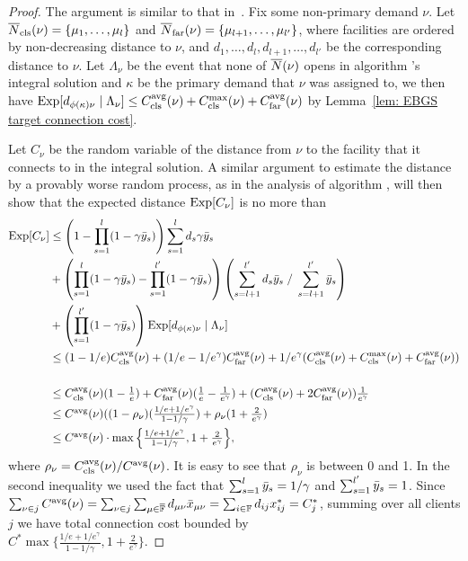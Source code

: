 \begin{proof}
  The argument is similar to that in~\cite{ByrkaGS10}. Fix some
  non-primary demand $\nu$. Let ${\overline{N}}_{{\mbox{\scriptsize\rm cls}}}(\nu) =
  \{\mu_1,\ldots,\mu_l\}$ and ${\overline{N}}_{{\mbox{\scriptsize\rm far}}}(\nu) = \{\mu_{l+1}, \ldots,
  \mu_{l'}\}$, where facilities are ordered by non-decreasing distance
  to $\nu$, and $d_1,\ldots,d_l,d_{l+1},\ldots,d_{l'}$ be the
  corresponding distance to $\nu$. Let $\Lambda_{\nu}$ be the event
  that none of ${\overline{N}}(\nu)$ opens in algorithm {\EBGS}'s integral
  solution and $\kappa$ be the primary demand that $\nu$ was assigned
  to, we then have $\mbox{\rm Exp}[d_{\phi(\kappa)\nu}\mid \Lambda_{\nu}] \leq
  C_{{\mbox{\scriptsize\rm cls}}}^{{\mbox{\scriptsize\rm avg}}}(\nu) + C_{{\mbox{\scriptsize\rm cls}}}^{\max}(\nu) + C_{{\mbox{\scriptsize\rm far}}}^{{\mbox{\scriptsize\rm avg}}}(\nu)$ by Lemma~\ref{lem:
    EBGS target connection cost}.

  Let $C_{\nu}$ be the random variable of the distance from $\nu$ to
  the facility that it connects to in the integral solution. A similar
  argument to estimate the distance by a provably worse random
  process, as in the analysis of algorithm {\ECHS}, will then show that
  the expected distance $\mbox{\rm Exp}[C_\nu]$ is no more than
  \begin{align*}
    \mbox{\rm Exp}[C_{\nu}] 
    &\leq \left(1-\prod_{s=1}^l (1-\gamma{\bar y}_s)\right) \sum_{s=1}^l d_s \gamma{\bar y}_s\\
    &+ \left(\prod_{s=1}^l(1-\gamma{\bar y}_s) - \prod_{s=1}^{l'}(1-\gamma{\bar y}_s)\right) \left(\sum_{s=l+1}^{l'} d_s{\bar y}_s\;/ \;\sum_{s=l+1}^{l'} {\bar y}_s \right)\\
    &+ \left(\prod_{s=1}^{l'} (1-\gamma{\bar y}_s)\right) \mbox{\rm Exp}[d_{\phi(\kappa)\nu} \mid \Lambda_\nu]\\
    &\leq (1-1/e)C_{{\mbox{\scriptsize\rm cls}}}^{{\mbox{\scriptsize\rm avg}}}(\nu) + (1/e - 1/e^\gamma)C_{{\mbox{\scriptsize\rm far}}}^{{\mbox{\scriptsize\rm avg}}}(\nu) + 1/e^\gamma (C_{{\mbox{\scriptsize\rm cls}}}^{{\mbox{\scriptsize\rm avg}}}(\nu) + C_{{\mbox{\scriptsize\rm cls}}}^{\max}(\nu) + C_{{\mbox{\scriptsize\rm far}}}^{{\mbox{\scriptsize\rm avg}}}(\nu))\\
\\
  &\leq 
	\textstyle
	C_{{\mbox{\scriptsize\rm cls}}}^{{\mbox{\scriptsize\rm avg}}}(\nu)(1-\frac{1}{e}) + C_{{\mbox{\scriptsize\rm far}}}^{{\mbox{\scriptsize\rm avg}}}(\nu)(\frac{1}{e}-\frac{1}{e^\gamma})
	 			+ (C_{{\mbox{\scriptsize\rm cls}}}^{{\mbox{\scriptsize\rm avg}}}(\nu)+2C_{{\mbox{\scriptsize\rm far}}}^{{\mbox{\scriptsize\rm avg}}}(\nu))\frac{1}{e^\gamma}
\\
  &\leq
	\textstyle
  C^{{\mbox{\scriptsize\rm avg}}}(\nu)((1-\rho_{\nu})(\frac{1/e+1/e^\gamma}{1-1/\gamma})
  + \rho_{\nu}(1+\frac{2}{e^\gamma}) 
\\
  &\leq 
	\textstyle
	C^{{\mbox{\scriptsize\rm avg}}}(\nu) \cdot \max\Big\{\frac{1/e+1/e^\gamma}{1-1/\gamma},
  								1+\frac{2}{e^\gamma}\Big\},
\end{align*}
%
where $\rho_{\nu}=C_{{\mbox{\scriptsize\rm cls}}}^{{\mbox{\scriptsize\rm avg}}}(\nu)/C^{{\mbox{\scriptsize\rm avg}}}(\nu)$. It is easy to see that
$\rho_{\nu}$ is between 0 and 1. In the second inequality we used the
fact that $\sum_{s=1}^l {\bar y}_{s} = 1/\gamma$ and $\sum_{s=1}^{l'}
{\bar y}_{s} = 1$. Since $\sum_{\nu\in j} C^{{\mbox{\scriptsize\rm avg}}}(\nu)
= \sum_{\nu\in j}\sum_{\mu\in\overline{\mathbb{F}}} d_{\mu\nu}{\bar x}_{\mu\nu} =
\sum_{i\in\mathbb{F}} d_{ij}x_{ij}^\ast = C_j^\ast$, summing over all
clients $j$ we have total connection cost bounded by \\$C^\ast
\max\{\frac{1/e+1/e^\gamma}{1-1/\gamma}, 1+\frac{2}{e^\gamma}\}$.
\end{proof}

